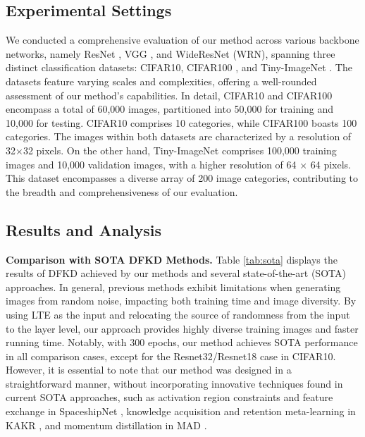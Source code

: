 \documentclass{article} %
\begin{document}
\subsection{Experimental Settings}
We conducted a comprehensive evaluation of our method across various backbone networks, namely ResNet \citep{resnet}, VGG \citep{vgg}, and WideResNet (WRN)\citep{wrn}, spanning three distinct classification datasets: CIFAR10, CIFAR100 \citep{c10}, and Tiny-ImageNet \citep{tin}. The datasets feature varying scales and complexities, offering a well-rounded assessment of our method's capabilities. In detail, CIFAR10 and CIFAR100 encompass a total of 60,000 images, partitioned into 50,000 for training and 10,000 for testing. CIFAR10 comprises 10 categories, while CIFAR100 boasts 100 categories. The images within both datasets are characterized by a resolution of 32×32 pixels. On the other hand, Tiny-ImageNet comprises 100,000 training images and 10,000 validation images, with a higher resolution of 64 × 64 pixels. This dataset encompasses a diverse array of 200 image categories, contributing to the breadth and comprehensiveness of our evaluation.

\subsection{Results and Analysis}

\noindent
\textbf{Comparison with SOTA DFKD Methods.} Table \ref{tab:sota} displays the results of DFKD achieved by our methods and several state-of-the-art (SOTA) approaches. In general, previous methods exhibit limitations when generating images from random noise, impacting both training time and image diversity. By using LTE as the input and relocating the source of randomness from the input to the layer level,  our approach provides highly diverse training images and faster running time. Notably, with 300 epochs, our method achieves SOTA performance in all comparison cases, except for the Resnet32/Resnet18 case in CIFAR10. However, it is essential to note that our method was designed in a straightforward manner, without incorporating innovative techniques found in current SOTA approaches, such as activation region constraints and feature exchange in SpaceshipNet  \citep{spshnet}, knowledge acquisition and retention meta-learning in KAKR \citep{kakr}, and momentum distillation in MAD \citep{mad}.
\end{document}
